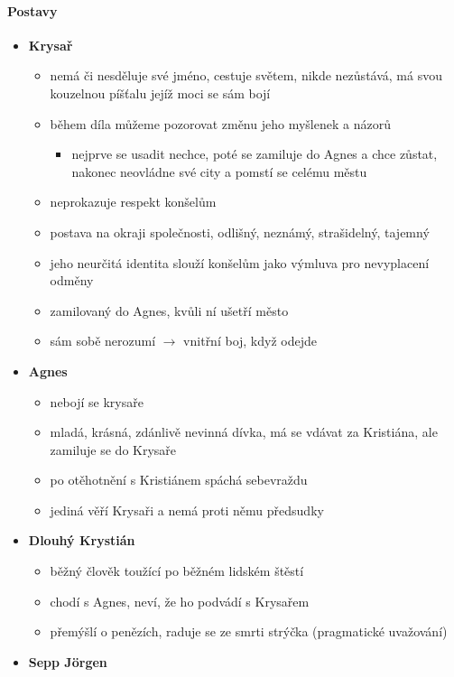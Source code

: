 \documentclass[10pt,a4paper]{article}
\newcommand{\ra}{$\rightarrow$ }
\begin{document}
\paragraph{Postavy}
\begin{itemize}
\item \textbf{Krysař}
	\begin{itemize}
	\item nemá či nesděluje své jméno, cestuje světem, nikde nezůstává, má svou kouzelnou píšťalu jejíž moci se sám bojí
	\item během díla můžeme pozorovat změnu jeho myšlenek a názorů
		\begin{itemize}
		\item nejprve se usadit nechce, poté se zamiluje do Agnes a chce zůstat, nakonec neovládne své city a pomstí se celému městu
		\end{itemize}
	\item neprokazuje respekt konšelům
	\item postava na okraji společnosti, odlišný, neznámý, strašidelný, tajemný
	\item jeho neurčitá identita slouží konšelům jako výmluva pro nevyplacení odměny
	\item zamilovaný do Agnes, kvůli ní ušetří město
	\item sám sobě nerozumí \ra vnitřní boj, když odejde
	\end{itemize}
\item \textbf{Agnes}
	\begin{itemize}
	\item nebojí se krysaře
	\item mladá, krásná, zdánlivě nevinná dívka, má se vdávat za Kristiána, ale zamiluje se do Krysaře
	\item po otěhotnění s Kristiánem spáchá sebevraždu
	\item jediná věří Krysaři a nemá proti němu předsudky
	\end{itemize}
\item \textbf{Dlouhý Krystián}
	\begin{itemize}
	\item běžný člověk toužící po běžném lidském štěstí
	\item chodí s Agnes, neví, že ho podvádí s Krysařem
	\item přemýšlí o penězích, raduje se ze smrti strýčka (pragmatické uvažování)
	\end{itemize}
\item \textbf{Sepp Jörgen}
	\begin{itemize}

\end{itemize}
\end{itemize}
\end{document}
